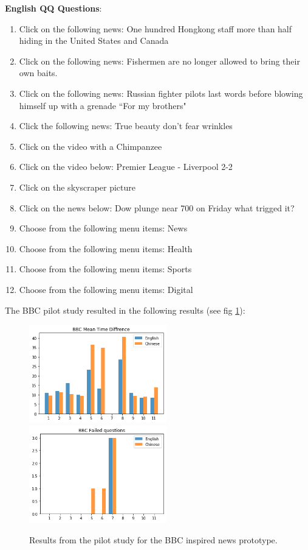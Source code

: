 \textbf{English QQ Questions}:
\begin{enumerate}

	
	\item Click on the following news: One hundred Hongkong staff more than half hiding in the United States and Canada
	
	\item Click on the following news: Fishermen are no longer allowed to bring their own baits.
	
	\item Click on the following news: Russian fighter pilots last words before blowing himself up with a grenade “For my brothers"
		
	\item Click the following news: True beauty don’t fear wrinkles
		
	\item Click on the video with a Chimpanzee
	
	\item Click on the video below: Premier League - Liverpool 2-2
		
	\item Click on the skyscraper picture
		
	\item Click on the news below: Dow plunge near 700 on Friday what trigged it?
		
	\item Choose from the following menu items: News
		
	\item Choose from the following menu items: Health
		
	\item Choose from the following menu items: Sports
	
	\item Choose from the following menu items: Digital
\end{enumerate}
The BBC pilot study resulted in the following results (see fig \ref{fig:pilot_study_bbc}): 
\begin{figure}[h]
	\centering
	\includegraphics[width=60mm]{Images/pilot_study_bbc_mean_time}
	\includegraphics[width=60mm]{Images/pilot_study_bbc_failed}
	\decoRule
		\caption[BBC pilot study results]{Results from the pilot study for the BBC inspired news prototype.}
	\label{fig:pilot_study_bbc}
\end{figure}
